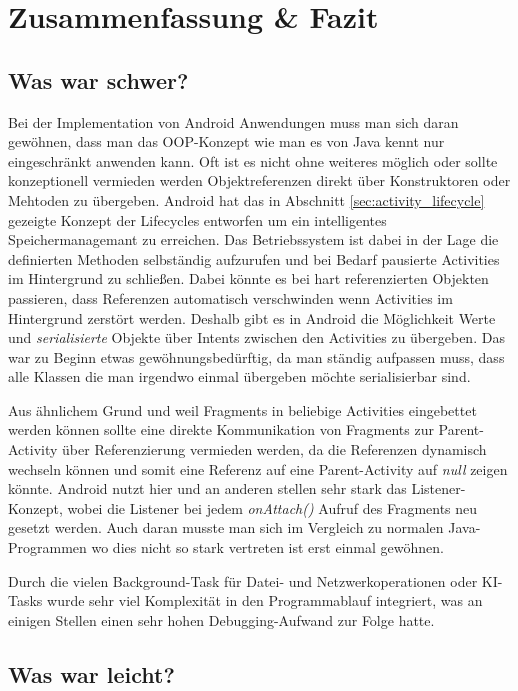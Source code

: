 \chapter{Zusammenfassung \& Fazit}
\section{Was war schwer?}

Bei der Implementation von Android Anwendungen muss man sich daran gewöhnen, dass man das OOP-Konzept wie man es von Java kennt nur eingeschränkt anwenden kann. Oft ist es nicht ohne weiteres möglich oder sollte konzeptionell vermieden werden Objektreferenzen direkt über Konstruktoren oder Mehtoden zu übergeben. Android hat das in Abschnitt \ref{sec:activity_lifecycle} gezeigte Konzept der Lifecycles entworfen um ein intelligentes Speichermanagemant zu erreichen. Das Betriebssystem ist dabei in der Lage die definierten Methoden selbständig aufzurufen und bei Bedarf pausierte Activities im Hintergrund zu schließen. Dabei könnte es bei hart referenzierten Objekten passieren, dass Referenzen automatisch verschwinden wenn Activities im Hintergrund zerstört werden. Deshalb gibt es in Android die Möglichkeit Werte und \emph{serialisierte} Objekte über Intents zwischen den Activities  zu übergeben. Das war zu Beginn etwas gewöhnungsbedürftig, da man ständig aufpassen muss, dass alle Klassen die man irgendwo einmal übergeben möchte serialisierbar sind.

Aus ähnlichem Grund und weil Fragments in beliebige Activities eingebettet werden können sollte eine direkte Kommunikation von Fragments zur Parent-Activity über Referenzierung vermieden werden, da die Referenzen dynamisch wechseln können und somit eine Referenz auf eine Parent-Activity auf \emph{null} zeigen könnte. Android nutzt hier und an anderen stellen sehr stark das Listener-Konzept, wobei die Listener bei jedem \emph{onAttach()} Aufruf des Fragments neu gesetzt werden. 
Auch daran musste man sich im Vergleich zu normalen Java-Programmen wo dies nicht so stark vertreten ist erst einmal gewöhnen. 

Durch die vielen Background-Task für Datei- und Netzwerkoperationen oder KI-Tasks wurde sehr viel Komplexität in den Programmablauf integriert, was an einigen Stellen einen sehr hohen Debugging-Aufwand zur Folge hatte. 

\section{Was war leicht?}

